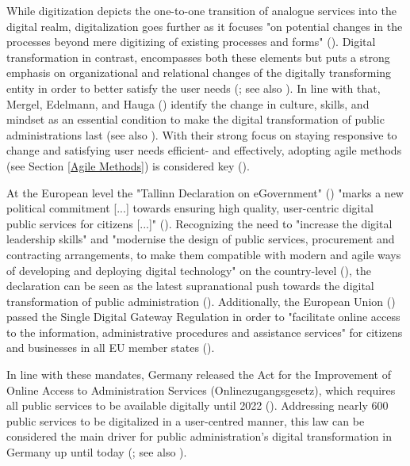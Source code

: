 While digitization depicts the one-to-one transition of analogue services into the digital realm, digitalization goes further as it focuses "on potential changes in the processes beyond mere digitizing of existing processes and forms" (\cite[p. 12]{Mergel2019a}). Digital transformation in contrast, encompasses both these elements but puts a strong emphasis on organizational and relational changes of the digitally transforming entity in order to better satisfy the user needs (\cite{Mergel2019a}; see also \cite{Vial2019, Henriette2015}). In line with that, Mergel, Edelmann, and Hauga (\cite*{Mergel2019a}) identify the change in culture, skills, and mindset as an essential condition to make the digital transformation of public administrations last (see also \cite{Dierks2020, Parcell2013}). With their strong focus on staying responsive to change and satisfying user needs efficient- and effectively, adopting agile methods (see Section \ref{Agile Methods}) is considered key (\cite{Mergel2018,Beyer2010, Mergel2019, osmundsen2020, Andriole2018}).\par 
At the European level the "Tallinn Declaration on eGovernment" (\cite*{EuropeanCommission2017}) "marks a new political commitment [...] towards ensuring high quality, user-centric digital public services for citizens [...]" (\cite{EuropeanCommission2017a}). Recognizing the need to "increase the digital leadership skills" and "modernise the design of public services, procurement and contracting arrangements, to make them compatible with modern and agile ways of developing and deploying digital technology" on the country-level (\cite[p. 7]{EuropeanCommission2017}), the declaration can be seen as the latest supranational push towards the digital transformation of public administration (\cite{Mergel2019a}). Additionally, the European Union (\cite*{EuropeanUnion2018}) passed the Single Digital Gateway Regulation in order to "facilitate online access to the information, administrative procedures and assistance services" for citizens and businesses in all EU member states (\cite{EuropeanCommission2018a}).\par 
In line with these mandates, Germany released the Act for the Improvement of Online Access to Administration Services (Onlinezugangsgesetz), which requires all public services to be available digitally until 2022 (\cite{DeutscherBundestag2017}). Addressing nearly 600 public services to be digitalized in a user-centred manner, this law can be considered the main driver for public administration's digital transformation in Germany up until today (\cite{Mergel2019, BundesministeriumdesInnerenfurBauundHeimat2017}; see also \cite{EuropeanCommission2019a}).\par 
